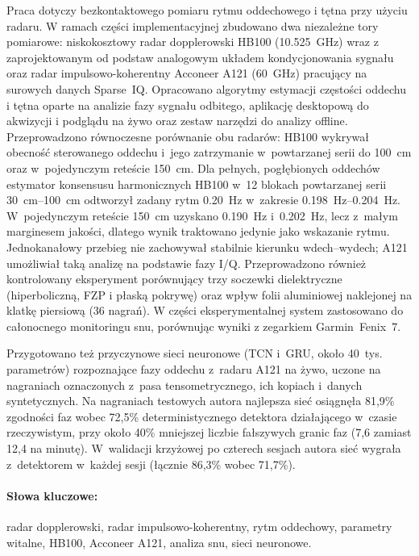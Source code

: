 \documentclass[12pt,a4paper,oneside]{report}
\begin{document}
Praca dotyczy bezkontaktowego pomiaru rytmu oddechowego i tętna przy użyciu
radaru. W ramach części implementacyjnej zbudowano dwa niezależne tory
pomiarowe: niskokosztowy radar dopplerowski HB100 (\SI{10.525}{GHz}) wraz
z zaprojektowanym od podstaw analogowym układem kondycjonowania sygnału oraz
radar impulsowo-koherentny Acconeer A121 (\SI{60}{GHz}) pracujący na surowych
danych Sparse~IQ. Opracowano algorytmy estymacji częstości oddechu i tętna
oparte na analizie fazy sygnału odbitego, aplikację desktopową do akwizycji
i podglądu na żywo oraz zestaw narzędzi do analizy offline. Przeprowadzono
równoczesne porównanie obu radarów: HB100 wykrywał obecność sterowanego
oddechu i~jego zatrzymanie w~powtarzanej serii do \SI{100}{cm} oraz
w~pojedynczym reteście \SI{150}{cm}. Dla pełnych, pogłębionych oddechów
estymator konsensusu harmonicznych HB100 w~12 blokach powtarzanej serii
\SIrange{30}{100}{cm} odtworzył zadany rytm \SI{0.20}{Hz} w~zakresie
\SIrange{0.198}{0.204}{Hz}. W~pojedynczym reteście \SI{150}{cm} uzyskano
\SI{0.190}{Hz} i~\SI{0.202}{Hz}, lecz z~małym marginesem jakości, dlatego
wynik traktowano jedynie jako wskazanie rytmu. Jednokanałowy przebieg nie
zachowywał stabilnie kierunku wdech--wydech; A121 umożliwiał taką analizę na
podstawie fazy I/Q. Przeprowadzono również
kontrolowany eksperyment porównujący trzy soczewki dielektryczne
(hiperboliczną, FZP i płaską pokrywę) oraz wpływ folii aluminiowej naklejonej
na klatkę piersiową (36 nagrań). W części eksperymentalnej system zastosowano
do całonocnego monitoringu snu, porównując wyniki z zegarkiem Garmin~Fenix~7.

Przygotowano też przyczynowe sieci neuronowe (TCN i~GRU, około 40~tys.
parametrów) rozpoznające fazy oddechu z~radaru A121 na żywo, uczone na nagraniach
oznaczonych z~pasa tensometrycznego, ich kopiach i~danych syntetycznych. Na nagraniach
testowych autora najlepsza sieć osiągnęła 81,9\% zgodności faz wobec 72,5\%
deterministycznego detektora działającego w~czasie rzeczywistym, przy około 40\% mniejszej
liczbie fałszywych granic faz (7,6 zamiast 12,4 na minutę). W~walidacji krzyżowej po
czterech sesjach autora sieć wygrała z~detektorem w~każdej sesji (łącznie 86,3\% wobec 71,7\%).

\paragraph{Słowa kluczowe:} radar dopplerowski, radar impulsowo-koherentny,
rytm oddechowy, parametry witalne, HB100, Acconeer A121, analiza snu, sieci
neuronowe.
\end{document}

